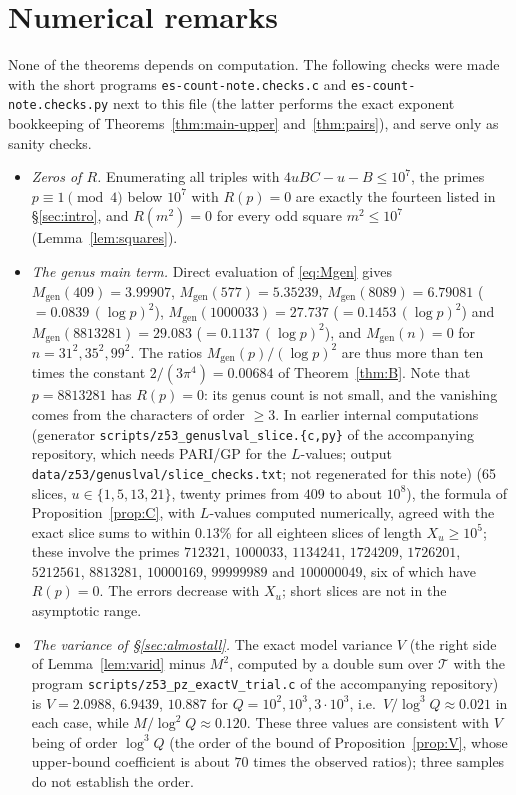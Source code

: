 \documentclass[11pt,reqno]{amsart}
\theoremstyle{definition}
\newcommand{\cT}{\mathcal T}
\newcommand{\Mgen}{M_{\mathrm{gen}}}
\begin{document}
\section{Numerical remarks}\label{sec:numerics}
None of the theorems depends on computation.  The following checks were
made with the short programs \texttt{es-count-note.checks.c} and
\texttt{es-count-note.checks.py} next to this file (the latter performs the
exact exponent bookkeeping of Theorems~\ref{thm:main-upper}
and~\ref{thm:pairs}), and serve only as sanity checks.
\begin{itemize}
\item \emph{Zeros of $R$.}  Enumerating all triples with
$4uBC-u-B\le10^7$, the primes $p\equiv1\pmod 4$ below $10^7$ with
$R(p)=0$ are exactly the fourteen listed in \S\ref{sec:intro}, and
$R(m^2)=0$ for every odd square $m^2\le10^7$ (Lemma~\ref{lem:squares}).
\item \emph{The genus main term.}  Direct evaluation of
\eqref{eq:Mgen} gives $\Mgen(409)=3.99907$, $\Mgen(577)=5.35239$,
$\Mgen(8089)=6.79081$ ($=0.0839\,(\log p)^2$), $\Mgen(1000033)=27.737$
($=0.1453\,(\log p)^2$) and $\Mgen(8813281)=29.083$ ($=0.1137\,(\log
p)^2$), and $\Mgen(n)=0$ for $n=31^2,35^2,99^2$.  The ratios
$\Mgen(p)/(\log p)^2$ are thus more than ten times the constant
$2/(3\pi^4)=0.00684$ of Theorem~\ref{thm:B}.  Note that $p=8813281$ has
$R(p)=0$: its genus count is not small, and the vanishing comes from
the characters of order $\ge3$.  In earlier internal computations (generator
\texttt{scripts/z53\_genuslval\_slice.\{c,py\}} of the accompanying
repository, which needs PARI/GP for the $L$-values; output
\texttt{data/z53/genuslval/slice\_checks.txt}; not regenerated for this
note) (65 slices,
$u\in\{1,5,13,21\}$, twenty primes from $409$ to about $10^8$), the
formula of Proposition~\ref{prop:C}, with $L$-values computed
numerically, agreed with the exact slice sums to within $0.13\%$ for all
eighteen slices of length $X_u\ge10^5$; these involve the primes
$712321$, $1000033$, $1134241$, $1724209$, $1726201$, $5212561$,
$8813281$, $10000169$, $99999989$ and $100000049$, six of which have
$R(p)=0$.  The errors decrease with $X_u$; short slices are not in the
asymptotic range.
\item \emph{The variance of \S\ref{sec:almostall}.}  The exact model
variance $V$ (the right side of Lemma~\ref{lem:varid} minus $M^2$,
computed by a double sum over $\cT$ with the program
\texttt{scripts/z53\_pz\_exactV\_trial.c} of the accompanying repository) is $V=2.0988$, $6.9439$, $10.887$
for $Q=10^2,10^3,3\cdot10^3$, i.e.\ $V/\log^3Q\approx0.021$ in each case,
while $M/\log^2Q\approx0.120$.
These three values are consistent with $V$ being of order $\log^3Q$
(the order of the bound of Proposition~\ref{prop:V}, whose
upper-bound coefficient is about $70$ times the observed ratios);
three samples do not establish the order.
\end{itemize}
\end{document}
